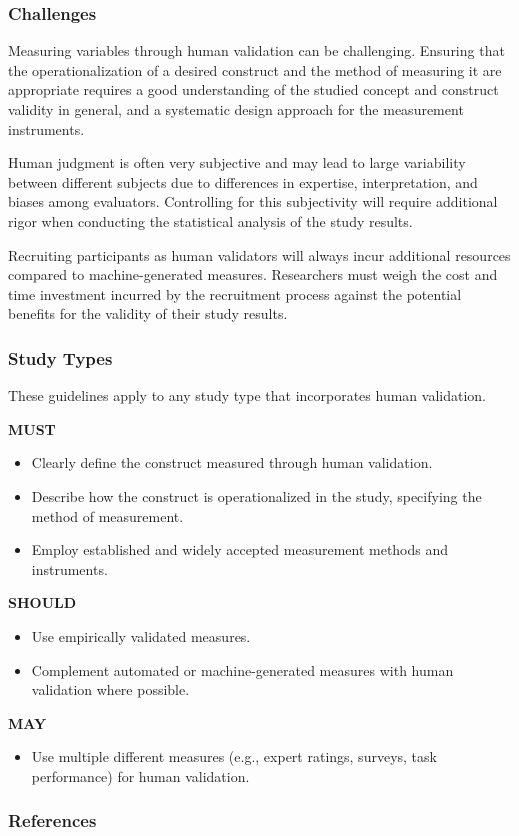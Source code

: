 \subsubsection{Challenges}

Measuring variables through human validation can be challenging.
Ensuring that the operationalization of a desired construct and the method of measuring it are appropriate requires a good understanding of the studied concept and construct validity in general, and a systematic design approach for the measurement instruments.

Human judgment is often very subjective and may lead to large variability between different subjects due to differences in expertise, interpretation, and biases among evaluators.
Controlling for this subjectivity will require additional rigor when conducting the statistical analysis of the study results.

Recruiting participants as human validators will always incur additional resources compared to machine-generated measures.
Researchers must weigh the cost and time investment incurred by the recruitment process against the potential benefits for the validity of their study results.

\subsubsection{Study Types}

These guidelines apply to any study type that incorporates human validation.

\textbf{MUST}
\begin{itemize}
    \item Clearly define the construct measured through human validation.
    \item Describe how the construct is operationalized in the study, specifying the method of measurement.
    \item Employ established and widely accepted measurement methods and instruments.
\end{itemize}

\textbf{SHOULD}
\begin{itemize}
    \item Use empirically validated measures.
    \item Complement automated or machine-generated measures with human validation where possible.
\end{itemize}

\textbf{MAY}
\begin{itemize}
    \item Use multiple different measures (e.g., expert ratings, surveys, task performance) for human validation.
\end{itemize}

\subsubsection{References}





